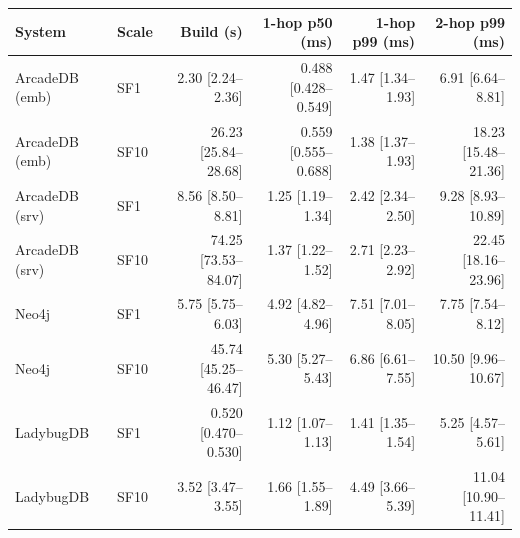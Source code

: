 \begin{tabular}{llrrrr}
\toprule
System & Scale & Build (s) & 1-hop p50 (ms) & 1-hop p99 (ms) & 2-hop p99 (ms) \\
\midrule
ArcadeDB (emb) & SF1 & 2.30 [2.24--2.36] & 0.488 [0.428--0.549] & 1.47 [1.34--1.93] & 6.91 [6.64--8.81] \\
ArcadeDB (emb) & SF10 & 26.23 [25.84--28.68] & 0.559 [0.555--0.688] & 1.38 [1.37--1.93] & 18.23 [15.48--21.36] \\
ArcadeDB (srv) & SF1 & 8.56 [8.50--8.81] & 1.25 [1.19--1.34] & 2.42 [2.34--2.50] & 9.28 [8.93--10.89] \\
ArcadeDB (srv) & SF10 & 74.25 [73.53--84.07] & 1.37 [1.22--1.52] & 2.71 [2.23--2.92] & 22.45 [18.16--23.96] \\
Neo4j & SF1 & 5.75 [5.75--6.03] & 4.92 [4.82--4.96] & 7.51 [7.01--8.05] & 7.75 [7.54--8.12] \\
Neo4j & SF10 & 45.74 [45.25--46.47] & 5.30 [5.27--5.43] & 6.86 [6.61--7.55] & 10.50 [9.96--10.67] \\
LadybugDB & SF1 & 0.520 [0.470--0.530] & 1.12 [1.07--1.13] & 1.41 [1.35--1.54] & 5.25 [4.57--5.61] \\
LadybugDB & SF10 & 3.52 [3.47--3.55] & 1.66 [1.55--1.89] & 4.49 [3.66--5.39] & 11.04 [10.90--11.41] \\
\bottomrule
\end{tabular}

